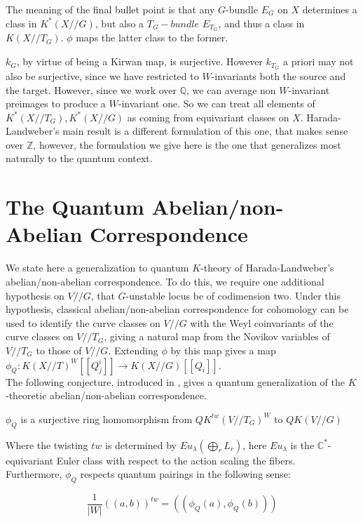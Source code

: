 \documentclass[11pt,letterpaper]{amsart}
\begin{document}
The meaning of the final bullet point is that any $G$-bundle $E_G$ on $X$ determines a class in $K^*(X//G)$, but also a $T_G-bundle$ $E_{T_G}$, and thus a class in $K(X//T_G)$. $\phi$ maps the latter class to the former. 

$k_G$, by virtue of being a Kirwan map, is surjective. However $k_{T_G}$ a priori may not also be surjective, since we have restricted to $W$-invariants both the source and the target. However, since we work over $\mathbb{Q}$, we can average non $W$-invariant preimages to produce a $W$-invariant one. So we can treat all elements of $K^*(X//T_G),K^*(X//G)$ as coming from equivariant classes on $X$. Harada-Landweber's main result is a different formulation of this one, that makes sense over $\mathbb{Z}$, however, the formulation we give here is the one that generalizes most naturally to the quantum context. 




\section{The Quantum Abelian/non-Abelian Correspondence}
We state here a generalization to quantum $K$-theory of Harada-Landweber's abelian/non-abelian correspondence. To do this, we require one additional hypothesis on $V//G$, that $G$-unstable locus be of codimension two. Under this hypothesis, classical abelian/non-abelian correspondence for cohomology can be used to identify the curve classes on $V//G$ with the Weyl coinvariants of the curve classes on $V//T_G$, giving a natural map from the Novikov variables of $V//T_G$ to those of $V//G$. Extending $\phi$ by this map gives a map $\phi_Q:K(X//T)^W[[Q^i_j]]\to K(X//G)[[Q_i]]$. \\


The following conjecture, introduced in \cite{me}, gives a quantum generalization of the $K$-theoretic abelian/non-abelian correspondence. 
\begin{conj}
\label{abconj}
    $\phi_Q$ is a surjective ring homomorphism from $QK^{tw}(V//T_G)^W$ to $QK(V//G)$

    Where the twisting $tw$ is determined by $Eu_{\lambda}(\bigoplus_r L_r)$, here $Eu_{\lambda}$ is the $\mathbb{C}^*$-equivariant Euler class with respect to the action scaling the fibers.\\

    

    Furthermore, $\phi_Q$ respects quantum pairings in the following sense:

    $$\frac{1}{|W|}((a,b))^{tw}=((\phi_Q(a),\phi_Q(b)))$$

    
\end{conj}
\end{document}
